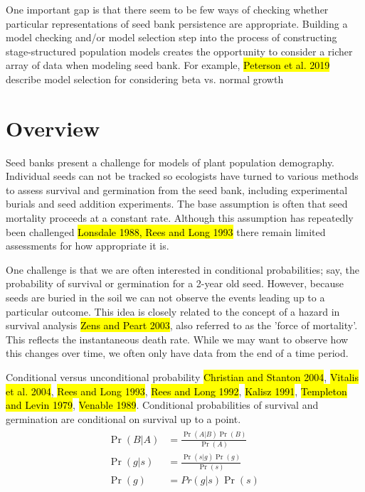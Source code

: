 \documentclass[12pt, oneside, titlepage]{article}   	%
\begin{document}
One important gap is that there seem to be few ways of checking whether particular representations of seed bank persistence are appropriate. Building a model checking and/or model selection step into the process of constructing stage-structured population models creates the opportunity to consider a richer array of data when modeling seed bank. For example, \hl{Peterson et al. 2019} describe model selection for considering beta vs. normal growth  

\section{Overview}

Seed banks present a challenge for models of plant population demography. Individual seeds can not be tracked so ecologists have turned to various methods to assess survival and germination from the seed bank, including experimental burials and seed addition experiments. The base assumption is often that seed mortality proceeds at a constant rate. Although this assumption has repeatedly been challenged \hl{Lonsdale 1988, Rees and Long 1993} there remain limited assessments for how appropriate it is. 

One challenge is that we are often interested in conditional probabilities; say, the probability of survival or germination for a 2-year old seed. However, because seeds are buried in the soil we can not observe the events leading up to a particular outcome. This idea is closely related to the concept of a hazard in survival analysis \hl{Zens and Peart 2003}, also referred to as the 'force of mortality'. This reflects the instantaneous death rate. While we may want to observe how this changes over time, we often only have data from the end of a time period. 

Conditional versus unconditional probability \hl{Christian and Stanton 2004}, \hl{Vitalis et al. 2004}, \hl{Rees and Long 1993}, \hl{Rees and Long 1992}, \hl{Kalisz 1991}, \hl{Templeton and Levin 1979}, \hl{Venable 1989}. Conditional probabilities of survival and germination are conditional on survival up to a point. 
%
\begin{align}
  \begin{split}
\Pr( B|A )  & = \frac{\Pr( A|B ) \Pr( B )}{ \Pr ( A )} \\
\Pr( g | s )  & = \frac{\Pr( s | g ) \Pr( g )}{ \Pr ( s )} \\ 
 \Pr( g ) & = Pr( g | s ) \Pr( s ) \
  \end{split}
\end{align}
%
\end{document}
